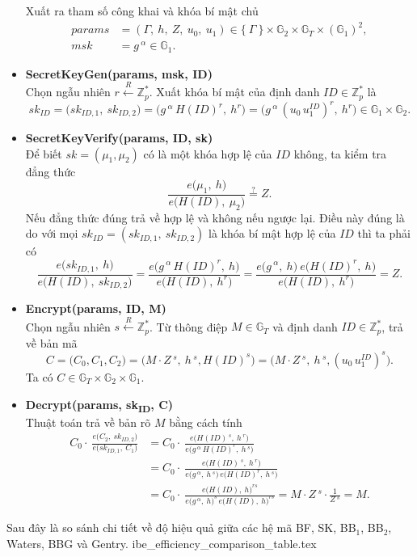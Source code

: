 \documentclass[class=report, crop=false]{standalone}
\begin{document}
\begin{itemize}[leftmargin=1cm, itemindent=-1cm]
			Xuất ra tham số công khai và khóa bí mật chủ
			\begin{align*}
				params &= (\Gamma,\ h,\ Z,\ u_0,\ u_1) \in \{\ \Gamma \ \} \times \mathbb{G}_2 \times \mathbb{G}_T \times (\mathbb{G}_1)^2, \\
				msk &= g\,^\alpha \in \mathbb{G}_1.
			\end{align*}
			\item[] {\sffamily\bfseries SecretKeyGen(params, msk, ID)} \\
			Chọn ngẫu nhiên $r \xleftarrow{R} \mathbb{Z}_p^*$. Xuất khóa bí mật của định danh $ID \in \mathbb{Z}_p^*$ là
			\[
				sk_{ID} = \Big(sk_{ID, 1},\ sk_{ID, 2} \Big) = \Big(g\,^\alpha\, H(ID)^r,\ h^r \Big) = \Big(g\,^\alpha\, (u_0 \, u_1^{ID})^r,\ h^r \Big) \in \mathbb{G}_1 \times \mathbb{G}_2.
			\]
			\item[] {\sffamily\bfseries SecretKeyVerify(params, ID, sk)} \\
			Để biết $sk = (\mu_1, \mu_2)$ có là một khóa hợp lệ của $ID$ không, ta kiểm tra đẳng thức
			\[
				\frac{e \Big(\mu_1,\ h \Big)}{e \Big(H(ID),\ \mu_2 \Big)} \overset{?}{=} Z.
			\]
			Nếu đẳng thức đúng trả về hợp lệ và không nếu ngược lại. Điều này đúng là do với mọi $sk_{ID} = (sk_{ID, 1},\ sk_{ID, 2})$ là khóa bí mật hợp lệ của $ID$ thì ta phải có
			\[
				\frac{e \Big(sk_{ID, 1},\ h \Big)}{e \Big(H(ID),\ sk_{ID, 2} \Big)} =
				\frac{e \Big(g\,^\alpha\, H(ID)^r,\ h \Big)}{e \Big(H(ID),\ h^r \Big)} =
				\frac{e \Big(g\,^\alpha,\ h \Big)\ e \Big(H(ID)^r,\ h \Big)}{e \Big(H(ID),\ h^r \Big)} = Z.
			\]
			\item[] {\sffamily\bfseries Encrypt(params, ID, M)} \\
			Chọn ngẫu nhiên $s \xleftarrow{R} \mathbb{Z}_p^*$. Từ thông điệp $M \in \mathbb{G}_T$ và định danh $ID \in \mathbb{Z}_p^*$, trả về bản mã
			\[
				C = \Big(C_0, C_1, C_2 \Big) = \Big(M \cdot Z\,^s,\ h\,^s, H(ID)^s \Big) = \Big(M \cdot Z\,^s,\ h\,^s, (u_0 \, u_1^{ID})^s \Big).
			\]
			Ta có $C \in \mathbb{G}_T \times \mathbb{G}_2 \times \mathbb{G}_1$.
			\item[] {\sffamily\bfseries Decrypt(params, sk\textsubscript{ID}, C)} \\
			Thuật toán trả về bản rõ $M$ bằng cách tính
			\begin{align*}
				C_0 \cdot\ \frac{e \Big(C_2,\ sk_{ID, 2} \Big)}{e \Big(sk_{ID, 1},\ C_1 \Big)} &=
				C_0 \cdot\ \frac{e \Big(H(ID)\,^s,\ h\,^r \Big)}{e \Big(g\,^\alpha\, H(ID)^r,\ h\,^s \Big)} \\ &=
				C_0 \cdot\ \frac{e \Big(H(ID)\,^s,\ h\,^r \Big)}{e \Big(g\,^\alpha,\ h\,^s \Big)\, e \Big(H(ID)^r,\ h\,^s \Big)} \\ &=
				C_0 \cdot\ \frac{e \Big(H(ID),\ h \Big)^{rs}}{e \Big(g\,^\alpha,\ h \Big)^s\, e \Big(H(ID),\ h \Big)^{rs}} = M \cdot Z\,^s \cdot \frac{1}{Z\,^s} = M.
			\end{align*}
		\end{itemize}
		Sau đây là so sánh chi tiết về độ hiệu quả giữa các hệ mã BF, SK, BB$_1$, BB$_2$, Waters, BBG và Gentry.
		{ibe_efficiency_comparison_table.tex}
\end{document}
